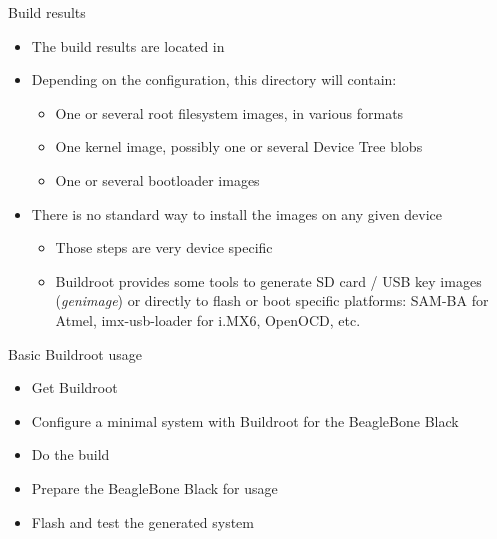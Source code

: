 \begin{frame}{Build results}
  \begin{itemize}
  \item The build results are located in 
  \item Depending on the configuration, this directory will contain:
    \begin{itemize}
    \item One or several root filesystem images, in various formats
    \item One kernel image, possibly one or several Device Tree blobs
    \item One or several bootloader images
    \end{itemize}
  \item There is no standard way to install the images on any given
    device
    \begin{itemize}
    \item Those steps are very device specific
    \item Buildroot provides some tools to generate SD card / USB key
      images ({\em genimage}) or directly to flash or boot specific
      platforms: SAM-BA for Atmel, imx-usb-loader for i.MX6, OpenOCD,
      etc.
    \end{itemize}
  \end{itemize}
\end{frame}

\setuplabframe
{Basic Buildroot usage}
{
  \begin{itemize}
  \item Get Buildroot
  \item Configure a minimal system with Buildroot for the BeagleBone
    Black
  \item Do the build
  \item Prepare the BeagleBone Black for usage
  \item Flash and test the generated system
  \end{itemize}
}
